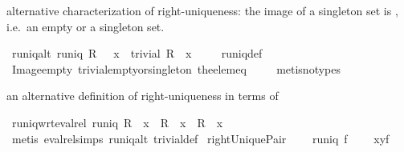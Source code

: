 \begin{isabellebody}
\endisatagproof
{\isafoldproof}%
%
\isadelimproof
%
\endisadelimproof
%
\begin{isamarkuptext}%
alternative characterization of right-uniqueness: the image of a singleton set is
   , i.e.\ an empty or a singleton set.%
\end{isamarkuptext}%
\isamarkuptrue%
\isamarkupfalse%
\ runiq{\isacharunderscore}alt{\isacharcolon}\ {\isachardoublequoteopen}runiq\ R\ {\isasymlongleftrightarrow}\ {\isacharparenleft}{\isasymforall}\ x\ {\isachardot}\ trivial\ {\isacharparenleft}R\ {\isacharbackquote}{\isacharbackquote}\ {\isacharbraceleft}x{\isacharbraceright}{\isacharparenright}{\isacharparenright}{\isachardoublequoteclose}\ \isanewline
%
\isadelimproof
\ \ %
\endisadelimproof
%
\isatagproof
{}\isamarkupfalse%
\ runiq{\isacharunderscore}def\ \isanewline
\ \ \isamarkupfalse%
\ Image{\isacharunderscore}empty\ trivial{\isacharunderscore}empty{\isacharunderscore}or{\isacharunderscore}singleton\ the{\isacharunderscore}elem{\isacharunderscore}eq\ \isanewline
\ \ \isamarkupfalse%
\ {\isacharparenleft}metis{\isacharparenleft}no{\isacharunderscore}types{\isacharparenright}{\isacharparenright}%
\endisatagproof
{\isafoldproof}%
%
\isadelimproof
%
\endisadelimproof
%
\begin{isamarkuptext}%
an alternative definition of right-uniqueness in terms of %
\end{isamarkuptext}%
\isamarkuptrue%
\isamarkupfalse%
\ runiq{\isacharunderscore}wrt{\isacharunderscore}eval{\isacharunderscore}rel{\isacharcolon}\ {\isachardoublequoteopen}runiq\ R\ {\isacharequal}\ {\isacharparenleft}{\isasymforall}x\ {\isachardot}\ R\ {\isacharbackquote}{\isacharbackquote}\ {\isacharbraceleft}x{\isacharbraceright}\ {\isasymsubseteq}\ {\isacharbraceleft}R\ {\isacharcomma}{\isacharcomma}\ x{\isacharbraceright}{\isacharparenright}{\isachardoublequoteclose}\ \isanewline
%
\isadelimproof
\ \ %
\endisadelimproof
%
\isatagproof
{}\isamarkupfalse%
\ {\isacharparenleft}metis\ eval{\isacharunderscore}rel{\isachardot}simps\ runiq{\isacharunderscore}alt\ trivial{\isacharunderscore}def{\isacharparenright}%
\endisatagproof
{\isafoldproof}%
%
\isadelimproof
\isanewline
%
\endisadelimproof
\isanewline
{}\isamarkupfalse%
\ rightUniquePair{\isacharcolon}\ \isanewline
\ \ \ {\isachardoublequoteopen}runiq\ f{\isachardoublequoteclose}\ \isanewline
\ \ \ {\isachardoublequoteopen}{\isacharparenleft}x{\isacharcomma}y{\isacharparenright}{\isasymin}f{\isachardoublequoteclose}\ \isanewline

\end{isabellebody}

